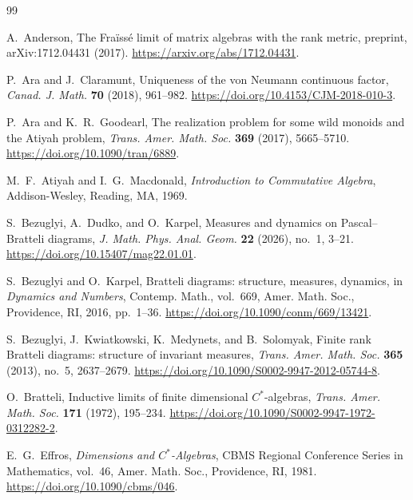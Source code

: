 \documentclass[11pt]{amsart}
\theoremstyle{definition}
\theoremstyle{remark}
\begin{document}
\begin{thebibliography}{99}

A.~Anderson,
\newblock The Fra\"iss\'e limit of matrix algebras with the rank metric,
\newblock preprint, arXiv:1712.04431 (2017).
\newblock \url{https://arxiv.org/abs/1712.04431}.

P.~Ara and J.~Claramunt,
\newblock Uniqueness of the von Neumann continuous factor,
\newblock \emph{Canad. J. Math.} \textbf{70} (2018), 961--982.
\newblock \url{https://doi.org/10.4153/CJM-2018-010-3}.

P.~Ara and K.~R.~Goodearl,
\newblock The realization problem for some wild monoids and the Atiyah problem,
\newblock \emph{Trans. Amer. Math. Soc.} \textbf{369} (2017), 5665--5710.
\newblock \url{https://doi.org/10.1090/tran/6889}.

M.~F.~Atiyah and I.~G.~Macdonald,
\newblock \emph{Introduction to Commutative Algebra},
\newblock Addison-Wesley, Reading, MA, 1969.

S.~Bezuglyi, A.~Dudko, and O.~Karpel,
\newblock Measures and dynamics on Pascal--Bratteli diagrams,
\newblock \emph{J. Math. Phys. Anal. Geom.} \textbf{22} (2026), no.~1,
  3--21.
\newblock \url{https://doi.org/10.15407/mag22.01.01}.

S.~Bezuglyi and O.~Karpel,
\newblock Bratteli diagrams: structure, measures, dynamics,
\newblock in \emph{Dynamics and Numbers}, Contemp. Math., vol.~669,
  Amer. Math. Soc., Providence, RI, 2016, pp.~1--36.
\newblock \url{https://doi.org/10.1090/conm/669/13421}.

S.~Bezuglyi, J.~Kwiatkowski, K.~Medynets, and B.~Solomyak,
\newblock Finite rank Bratteli diagrams: structure of invariant measures,
\newblock \emph{Trans. Amer. Math. Soc.} \textbf{365} (2013), no.~5,
  2637--2679.
\newblock \url{https://doi.org/10.1090/S0002-9947-2012-05744-8}.

O.~Bratteli,
\newblock Inductive limits of finite dimensional $C^*$-algebras,
\newblock \emph{Trans. Amer. Math. Soc.} \textbf{171} (1972), 195--234.
\newblock \url{https://doi.org/10.1090/S0002-9947-1972-0312282-2}.

E.~G.~Effros,
\newblock \emph{Dimensions and $C^*$-Algebras},
\newblock CBMS Regional Conference Series in Mathematics, vol.~46,
  Amer. Math. Soc., Providence, RI, 1981.
\newblock \url{https://doi.org/10.1090/cbms/046}.


\end{thebibliography}
\end{document}
